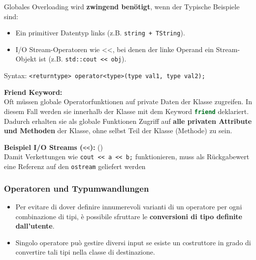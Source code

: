 Globales Overloading wird \textbf{zwingend benötigt}, wenn der  Typische Beispiele sind:
\begin{itemize}
    \item Ein primitiver Datentyp links (z.B. \verb|string + TString|).
    \item I/O Stream-Operatoren wie \textless{}\textless{}, bei denen der linke Operand ein Stream-Objekt ist (z.B. \verb|std::cout << obj|).
\end{itemize}

Syntax: \verb|<returntype> operator<type>(type val1, type val2);|\medskip

\textbf{Friend Keyword:}\\
Oft müssen globale Operatorfunktionen auf private Daten der Klasse zugreifen. In diesem 
Fall werden sie innerhalb der Klasse mit dem Keyword \lstinline[language=C++]|friend| deklariert. 
Dadurch erhalten sie als globale Funktionen Zugriff auf \textbf{alle privaten Attribute 
und Methoden} der Klasse, ohne selbst Teil der Klasse (Methode) zu sein. 




\textbf{Beispiel I/O Streams (\lstinline[language=C++]|<<|):} ()\\
Damit Verkettungen wie \verb|cout << a << b;| funktionieren, muss als Rückgabewert eine 
Referenz auf den \verb|ostream| geliefert werden


\subsubsection{Operatoren und Typumwandlungen}
\begin{itemize}
    \item Per evitare di dover definire innumerevoli varianti di un operatore per ogni combinazione di tipi, è possibile sfruttare le \textbf{conversioni di tipo definite dall'utente}.
    \item Singolo operatore può gestire diversi input se esiste un costruttore in grado di convertire tali tipi nella classe di destinazione.
\end{itemize}



